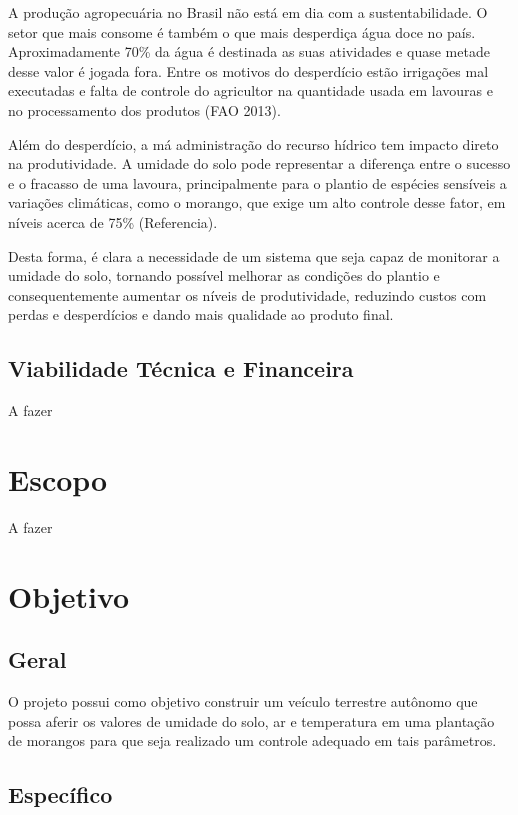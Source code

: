 A produção agropecuária no Brasil não está em dia com a sustentabilidade. O setor que mais consome é também o que mais desperdiça água doce no país. Aproximadamente 70\% da água é destinada as suas atividades e quase metade desse valor é jogada fora. Entre os motivos do desperdício estão irrigações mal executadas e falta de controle do agricultor na quantidade usada em lavouras e no processamento dos produtos (FAO 2013).

Além do desperdício, a má administração do recurso hídrico tem impacto direto na produtividade. A umidade do solo pode representar a diferença entre o sucesso e o fracasso de uma lavoura, principalmente para o plantio de espécies sensíveis a variações climáticas, como o morango, que exige um alto controle desse fator, em níveis acerca de 75\% (Referencia).

Desta forma, é clara a necessidade de um sistema que seja capaz de monitorar a umidade do solo, tornando possível melhorar as condições do plantio e consequentemente aumentar os níveis de produtividade, reduzindo custos com perdas e desperdícios e dando mais qualidade ao produto final.

\subsection{Viabilidade Técnica e Financeira}

A fazer


\section{Escopo}

A fazer

\section{Objetivo}

\subsection{Geral}

O projeto possui como objetivo construir um veículo terrestre autônomo que possa aferir os valores de umidade do solo, ar e temperatura em uma plantação de morangos para que seja realizado um controle adequado em tais parâmetros.

\subsection{Específico}

